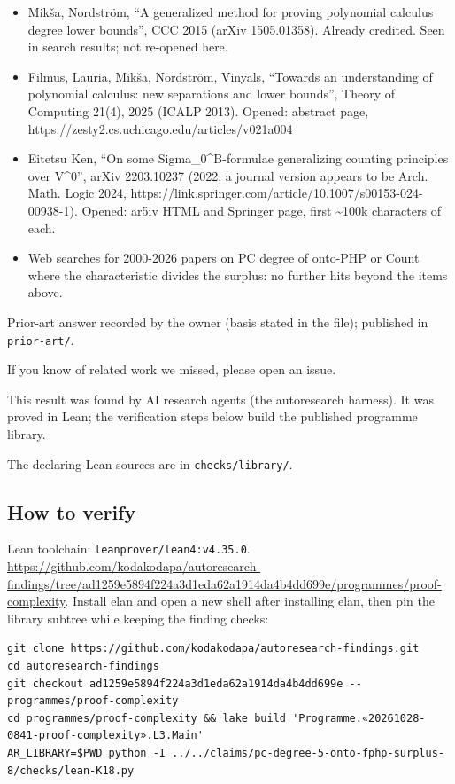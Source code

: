 \documentclass{article}
\begin{document}
\begin{itemize}
\item Mikša, Nordström, ``A generalized method for proving polynomial calculus degree lower bounds'', CCC 2015 (arXiv 1505.01358). Already credited. Seen in search results; not re-opened here.
\item Filmus, Lauria, Mikša, Nordström, Vinyals, ``Towards an understanding of polynomial calculus: new separations and lower bounds'', Theory of Computing 21(4), 2025 (ICALP 2013). Opened: abstract page, https://zesty2.cs.uchicago.edu/articles/v021a004
\item Eitetsu Ken, ``On some Sigma\_0\textasciicircum{}B-formulae generalizing counting principles over V\textasciicircum{}0'', arXiv 2203.10237 (2022; a journal version appears to be Arch. Math. Logic 2024, https://link.springer.com/article/10.1007/s00153-024-00938-1). Opened: ar5iv HTML and Springer page, first \textasciitilde{}100k characters of each.
\item Web searches for 2000-2026 papers on PC degree of onto-PHP or Count where the characteristic divides the surplus: no further hits beyond the items above.
\end{itemize}

Prior-art answer recorded by the owner (basis stated in the file); published in \texttt{prior-art/}.

If you know of related work we missed, please open an issue.

This result was found by AI research agents (the autoresearch harness). It was proved in Lean; the verification steps below build the published programme library.

The declaring Lean sources are in \texttt{checks/library/}.

\subsection*{How to verify}

Lean toolchain: \texttt{leanprover/lean4:v4.35.0}. \url{https://github.com/kodakodapa/autoresearch-findings/tree/ad1259e5894f224a3d1eda62a1914da4b4dd699e/programmes/proof-complexity}. Install elan and open a new shell after installing elan, then pin the library subtree while keeping the finding checks:

\begin{verbatim}
git clone https://github.com/kodakodapa/autoresearch-findings.git
cd autoresearch-findings
git checkout ad1259e5894f224a3d1eda62a1914da4b4dd699e -- programmes/proof-complexity
cd programmes/proof-complexity && lake build 'Programme.«20261028-0841-proof-complexity».L3.Main'
AR_LIBRARY=$PWD python -I ../../claims/pc-degree-5-onto-fphp-surplus-8/checks/lean-K18.py
\end{verbatim}
\end{document}
